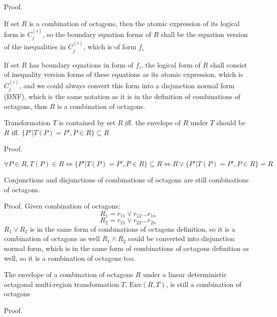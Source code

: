 \documentclass[letterpaper,]{article}
\providecommand{\tightlist}{%
  \setlength{\itemsep}{0pt}\setlength{\parskip}{0pt}}
\begin{document}
Proof.

If set \(R\) is a combination of octagons, then the atomic expression of
its logical form is \(C_j^{(i)}\), so the boundary equation forms of
\(R\) shall be the equation version of the inequalities in
\(C_j^{(i)}\), which is of form \(f_i\)

If set \(R\) has boundary equations in form of \(f_i\), the logical form
of \(R\) shall consist of inequality version forms of these equations as
its atomic expression, which is \(C_j^{(i)}\), and we could always
convert this form into a disjunction normal form (DNF), which is the
same notation as it is in the definition of combinations of octagons,
thus \(R\) is a combination of octagons.

\begin{description}
\tightlist
\item[Lemma 2]
Transformation \(T\) is contained by set \(R\) iff. the envelope of
\(R\) under \(T\) should be \(R\) iff.
\(\{P'| T(P) = P', P \in R\} \subseteq R\)
\end{description}

Proof.

\[\forall P\in R, T(P) \in R \Leftrightarrow  \{P'| T(P) = P', P \in R\}\subseteq R \Leftrightarrow  R \lor \{P'| T(P) = P', P \in R\} = R\]

\begin{description}
\tightlist
\item[Lemma 3]
Conjunctions and disjunctions of combinations of octagons are still
combinations of octagons.
\end{description}

Proof. Given combination of octagons:
\[R_1 = r_{11} \lor r_{12} \dots r_{1n}\]
\[R_2 = r_{21} \lor r_{22} \dots r_{2n}\] \(R_1 \lor R_2\) is in the
same form of combinations of octagons definition, so it is a combination
of octagons as well \(R_1 \land R_2\) could be converted into
disjunction normal form, which is in the same form of combinations of
octagons definition as well, so it is a combination of octagons too.

\begin{description}
\tightlist
\item[Lemma 4]
The envelope of a combination of octagons \(R\) under a linear
deterministic octagonal multi-region transformation \(T\),
\(\mathrm{Env}(R,T)\), is still a combination of octagons
\end{description}

Proof.
\end{document}
